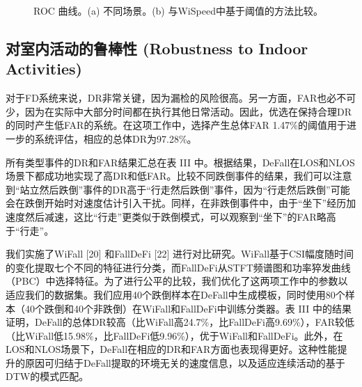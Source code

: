 \documentclass[journal]{IEEEtran}
\begin{document}
\begin{figure}[htbp]
\centering
\vspace{4cm} %
\caption{ROC 曲线。(a) 不同场景。(b) 与WiSpeed中基于阈值的方法比较。}
\end{figure}

\subsection{对室内活动的鲁棒性 (Robustness to Indoor Activities)}
对于FD系统来说，DR非常关键，因为漏检的风险很高。另一方面，FAR也必不可少，因为在实际中大部分时间都在执行其他日常活动。因此，优选在保持合理DR的同时产生低FAR的系统。在这项工作中，选择产生总体FAR 1.47\%的阈值用于进一步的系统评估，相应的总体DR为97.28\%。

所有类型事件的DR和FAR结果汇总在表 III 中。根据结果，DeFall在LOS和NLOS场景下都成功地实现了高DR和低FAR。比较不同跌倒事件的结果，我们可以注意到“站立然后跌倒”事件的DR高于“行走然后跌倒”事件，因为“行走然后跌倒”可能会在跌倒开始时对速度估计引入干扰。同样，在非跌倒事件中，由于“坐下”经历加速度然后减速，这比“行走”更类似于跌倒模式，可以观察到“坐下”的FAR略高于“行走”。

我们实施了WiFall [20] 和FallDeFi [22] 进行对比研究。WiFall基于CSI幅度随时间的变化提取七个不同的特征进行分类，而FallDeFi从STFT频谱图和功率猝发曲线（PBC）中选择特征。为了进行公平的比较，我们优化了这两项工作中的参数以适应我们的数据集。我们应用40个跌倒样本在DeFall中生成模板，同时使用80个样本（40个跌倒和40个非跌倒）在WiFall和FallDeFi中训练分类器。表 III 中的结果证明，DeFall的总体DR较高（比WiFall高24.7\%，比FallDeFi高9.69\%），FAR较低（比WiFall低15.98\%，比FallDeFi低9.96\%），优于WiFall和FallDeFi。此外，在LOS和NLOS场景下，DeFall在相应的DR和FAR方面也表现得更好。这种性能提升的原因可归结于DeFall提取的环境无关的速度信息，以及适应连续活动的基于DTW的模式匹配。
\end{document}

